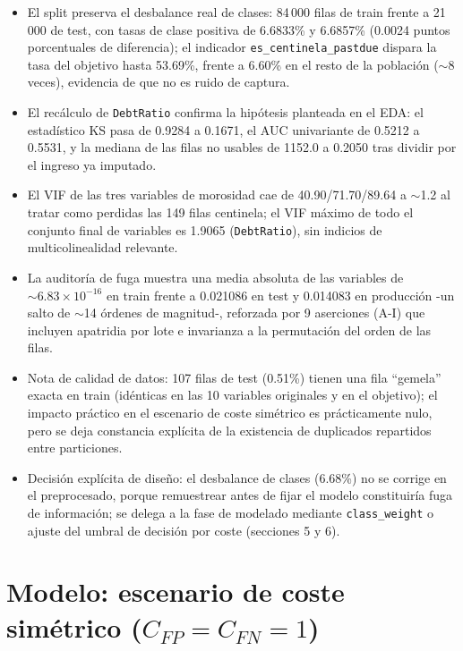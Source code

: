 \documentclass[11pt,a4paper]{article}
\begin{document}
\begin{itemize}
\item El split preserva el desbalance real de clases: 84\,000 filas de train frente a 21\,000 de test, con tasas de clase positiva de 6.6833\% y 6.6857\% (0.0024 puntos porcentuales de diferencia); el indicador \texttt{es\_centinela\_pastdue} dispara la tasa del objetivo hasta 53.69\%, frente a 6.60\% en el resto de la poblaci\'on ($\sim$8 veces), evidencia de que no es ruido de captura.
\item El rec\'alculo de \texttt{DebtRatio} confirma la hip\'otesis planteada en el EDA: el estad\'istico KS pasa de 0.9284 a 0.1671, el AUC univariante de 0.5212 a 0.5531, y la mediana de las filas no usables de 1152.0 a 0.2050 tras dividir por el ingreso ya imputado.
\item El VIF de las tres variables de morosidad cae de 40.90/71.70/89.64 a $\sim$1.2 al tratar como perdidas las 149 filas centinela; el VIF m\'aximo de todo el conjunto final de variables es 1.9065 (\texttt{DebtRatio}), sin indicios de multicolinealidad relevante.
\item La auditor\'ia de fuga muestra una media absoluta de las variables de $\sim 6.83 \times 10^{-16}$ en train frente a 0.021086 en test y 0.014083 en producci\'on -un salto de $\sim$14 \'ordenes de magnitud-, reforzada por 9 aserciones (A-I) que incluyen apatridia por lote e invarianza a la permutaci\'on del orden de las filas.
\item Nota de calidad de datos: 107 filas de test (0.51\%) tienen una fila ``gemela'' exacta en train (id\'enticas en las 10 variables originales y en el objetivo); el impacto pr\'actico en el escenario de coste sim\'etrico es pr\'acticamente nulo, pero se deja constancia expl\'icita de la existencia de duplicados repartidos entre particiones.
\item Decisi\'on expl\'icita de dise\~no: el desbalance de clases (6.68\%) no se corrige en el preprocesado, porque remuestrear antes de fijar el modelo constituir\'ia fuga de informaci\'on; se delega a la fase de modelado mediante \texttt{class\_weight} o ajuste del umbral de decisi\'on por coste (secciones 5 y 6).
\end{itemize}

\section{Modelo: escenario de coste sim\'etrico ($C_{FP} = C_{FN} = 1$)}
\label{sec:modelo-simetrico}
\end{document}
